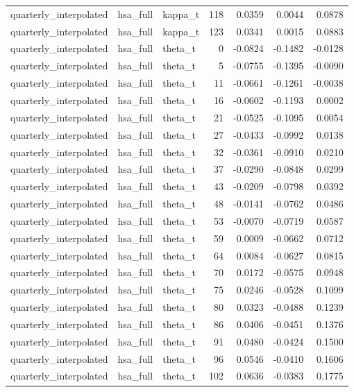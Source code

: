 \begin{tabular}{lllrrrr}
quarterly\_interpolated & hsa\_full & kappa\_t & 118 & 0.0359 & 0.0044 & 0.0878 \\
quarterly\_interpolated & hsa\_full & kappa\_t & 123 & 0.0341 & 0.0015 & 0.0883 \\
quarterly\_interpolated & hsa\_full & theta\_t & 0 & -0.0824 & -0.1482 & -0.0128 \\
quarterly\_interpolated & hsa\_full & theta\_t & 5 & -0.0755 & -0.1395 & -0.0090 \\
quarterly\_interpolated & hsa\_full & theta\_t & 11 & -0.0661 & -0.1261 & -0.0038 \\
quarterly\_interpolated & hsa\_full & theta\_t & 16 & -0.0602 & -0.1193 & 0.0002 \\
quarterly\_interpolated & hsa\_full & theta\_t & 21 & -0.0525 & -0.1095 & 0.0054 \\
quarterly\_interpolated & hsa\_full & theta\_t & 27 & -0.0433 & -0.0992 & 0.0138 \\
quarterly\_interpolated & hsa\_full & theta\_t & 32 & -0.0361 & -0.0910 & 0.0210 \\
quarterly\_interpolated & hsa\_full & theta\_t & 37 & -0.0290 & -0.0848 & 0.0299 \\
quarterly\_interpolated & hsa\_full & theta\_t & 43 & -0.0209 & -0.0798 & 0.0392 \\
quarterly\_interpolated & hsa\_full & theta\_t & 48 & -0.0141 & -0.0762 & 0.0486 \\
quarterly\_interpolated & hsa\_full & theta\_t & 53 & -0.0070 & -0.0719 & 0.0587 \\
quarterly\_interpolated & hsa\_full & theta\_t & 59 & 0.0009 & -0.0662 & 0.0712 \\
quarterly\_interpolated & hsa\_full & theta\_t & 64 & 0.0084 & -0.0627 & 0.0815 \\
quarterly\_interpolated & hsa\_full & theta\_t & 70 & 0.0172 & -0.0575 & 0.0948 \\
quarterly\_interpolated & hsa\_full & theta\_t & 75 & 0.0246 & -0.0528 & 0.1099 \\
quarterly\_interpolated & hsa\_full & theta\_t & 80 & 0.0323 & -0.0488 & 0.1239 \\
quarterly\_interpolated & hsa\_full & theta\_t & 86 & 0.0406 & -0.0451 & 0.1376 \\
quarterly\_interpolated & hsa\_full & theta\_t & 91 & 0.0480 & -0.0424 & 0.1500 \\
quarterly\_interpolated & hsa\_full & theta\_t & 96 & 0.0546 & -0.0410 & 0.1606 \\
quarterly\_interpolated & hsa\_full & theta\_t & 102 & 0.0636 & -0.0383 & 0.1775 \\

\end{tabular}
